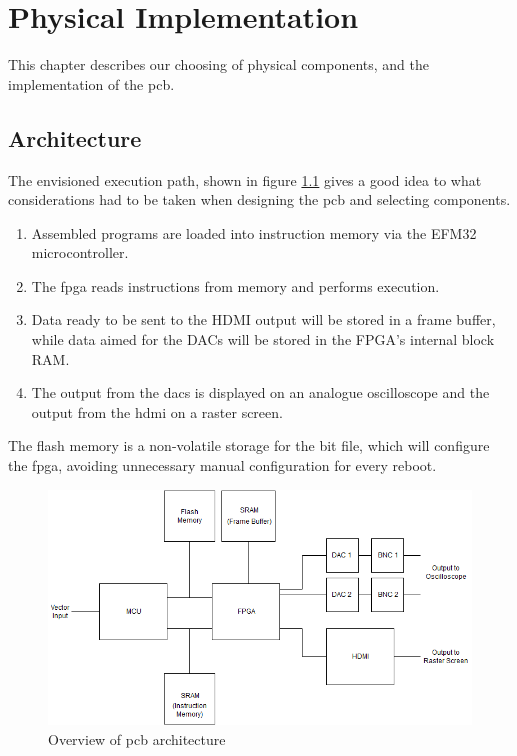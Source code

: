 \chapter{Physical Implementation}

This chapter describes our choosing of physical components, and the implementation of the \gls{pcb}.

\section{Architecture}
The envisioned execution path, shown in figure \ref{fig:PCB_Overview} gives a good idea to what considerations had to be taken when designing the \gls{pcb} and selecting components.

\begin{enumerate}
\item Assembled \vthreek programs are loaded into instruction memory via the EFM32 microcontroller.
\item The \gls{fpga} reads instructions from memory and performs execution.
\item Data ready to be sent to the HDMI output will be stored in a frame buffer, while data aimed for the DACs will be stored in the FPGA's internal block RAM.
\item The output from the \gls{dac}s is displayed on an analogue oscilloscope and the output from the \gls{hdmi} on a raster screen.
\end{enumerate}

The flash memory is a non-volatile storage for the bit file, which will configure the \gls{fpga}, avoiding unnecessary manual configuration for every reboot.

\begin{figure}[h!]
\centering
\includegraphics[scale = 0.56]{images/PCB_Overview.png}
\caption{Overview of \gls{pcb} architecture}
\label{fig:PCB_Overview}
\end{figure}

